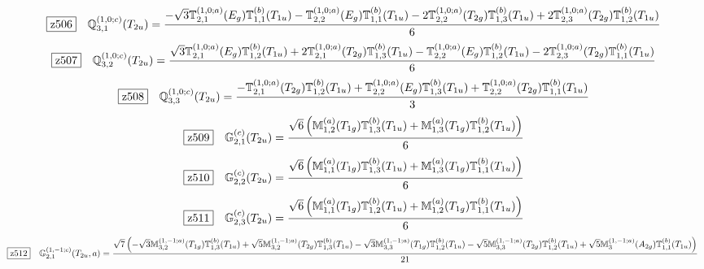 \documentclass[fleqn,10pt,landscape]{jsarticle}
\begin{document}
\begin{dmath*}
\hspace*{3mm}\fbox{z506}\quad \mathbb{Q}_{3,1}^{(1,0;c)}(T_{2u})=\frac{- \sqrt{3} \mathbb{T}_{2,1}^{(1,0;a)}(E_{g}) \mathbb{T}_{1,1}^{(b)}(T_{1u}) - \mathbb{T}_{2,2}^{(1,0;a)}(E_{g}) \mathbb{T}_{1,1}^{(b)}(T_{1u}) - 2 \mathbb{T}_{2,2}^{(1,0;a)}(T_{2g}) \mathbb{T}_{1,3}^{(b)}(T_{1u}) + 2 \mathbb{T}_{2,3}^{(1,0;a)}(T_{2g}) \mathbb{T}_{1,2}^{(b)}(T_{1u})}{6}
\end{dmath*}
\begin{dmath*}
\hspace*{3mm}\fbox{z507}\quad \mathbb{Q}_{3,2}^{(1,0;c)}(T_{2u})=\frac{\sqrt{3} \mathbb{T}_{2,1}^{(1,0;a)}(E_{g}) \mathbb{T}_{1,2}^{(b)}(T_{1u}) + 2 \mathbb{T}_{2,1}^{(1,0;a)}(T_{2g}) \mathbb{T}_{1,3}^{(b)}(T_{1u}) - \mathbb{T}_{2,2}^{(1,0;a)}(E_{g}) \mathbb{T}_{1,2}^{(b)}(T_{1u}) - 2 \mathbb{T}_{2,3}^{(1,0;a)}(T_{2g}) \mathbb{T}_{1,1}^{(b)}(T_{1u})}{6}
\end{dmath*}
\begin{dmath*}
\hspace*{3mm}\fbox{z508}\quad \mathbb{Q}_{3,3}^{(1,0;c)}(T_{2u})=\frac{- \mathbb{T}_{2,1}^{(1,0;a)}(T_{2g}) \mathbb{T}_{1,2}^{(b)}(T_{1u}) + \mathbb{T}_{2,2}^{(1,0;a)}(E_{g}) \mathbb{T}_{1,3}^{(b)}(T_{1u}) + \mathbb{T}_{2,2}^{(1,0;a)}(T_{2g}) \mathbb{T}_{1,1}^{(b)}(T_{1u})}{3}
\end{dmath*}
\begin{dmath*}
\hspace*{3mm}\fbox{z509}\quad \mathbb{G}_{2,1}^{(c)}(T_{2u})=\frac{\sqrt{6} \left(\mathbb{M}_{1,2}^{(a)}(T_{1g}) \mathbb{T}_{1,3}^{(b)}(T_{1u}) + \mathbb{M}_{1,3}^{(a)}(T_{1g}) \mathbb{T}_{1,2}^{(b)}(T_{1u})\right)}{6}
\end{dmath*}
\begin{dmath*}
\hspace*{3mm}\fbox{z510}\quad \mathbb{G}_{2,2}^{(c)}(T_{2u})=\frac{\sqrt{6} \left(\mathbb{M}_{1,1}^{(a)}(T_{1g}) \mathbb{T}_{1,3}^{(b)}(T_{1u}) + \mathbb{M}_{1,3}^{(a)}(T_{1g}) \mathbb{T}_{1,1}^{(b)}(T_{1u})\right)}{6}
\end{dmath*}
\begin{dmath*}
\hspace*{3mm}\fbox{z511}\quad \mathbb{G}_{2,3}^{(c)}(T_{2u})=\frac{\sqrt{6} \left(\mathbb{M}_{1,1}^{(a)}(T_{1g}) \mathbb{T}_{1,2}^{(b)}(T_{1u}) + \mathbb{M}_{1,2}^{(a)}(T_{1g}) \mathbb{T}_{1,1}^{(b)}(T_{1u})\right)}{6}
\end{dmath*}
\begin{dmath*}
\hspace*{3mm}\fbox{z512}\quad \mathbb{G}_{2,1}^{(1,-1;c)}(T_{2u},a)=\frac{\sqrt{7} \left(- \sqrt{3} \mathbb{M}_{3,2}^{(1,-1;a)}(T_{1g}) \mathbb{T}_{1,3}^{(b)}(T_{1u}) + \sqrt{5} \mathbb{M}_{3,2}^{(1,-1;a)}(T_{2g}) \mathbb{T}_{1,3}^{(b)}(T_{1u}) - \sqrt{3} \mathbb{M}_{3,3}^{(1,-1;a)}(T_{1g}) \mathbb{T}_{1,2}^{(b)}(T_{1u}) - \sqrt{5} \mathbb{M}_{3,3}^{(1,-1;a)}(T_{2g}) \mathbb{T}_{1,2}^{(b)}(T_{1u}) + \sqrt{5} \mathbb{M}_{3}^{(1,-1;a)}(A_{2g}) \mathbb{T}_{1,1}^{(b)}(T_{1u})\right)}{21}
\end{dmath*}
\end{document}
